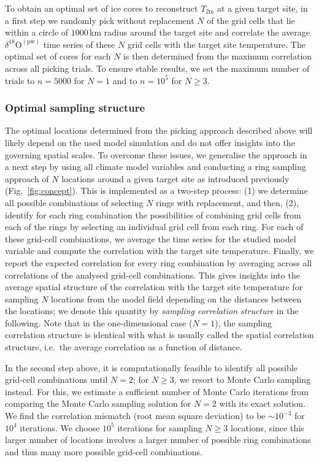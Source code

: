 \documentclass[cp, manuscript]{copernicus}
\begin{document}
To obtain an optimal set of ice cores to reconstruct $T_{2\mathrm{m}}$ at a
given target site, in a first step we randomly pick without replacement $N$ of
the grid cells that lie within a circle of $1000$\,km radius around the target
site and correlate the average $\delta^{18}\mathrm{O}^{\mathrm{(pw)}}$ time
series of these $N$ grid cells with the target site temperature. The optimal set
of cores for each $N$ is then determined from the maximum correlation across all
picking trials. To ensure stable results, we set the maximum number of trials to
$n=5000$ for $N=1$ and to $n=10^5$ for $N\geq3$.

\subsubsection{Optimal sampling structure}\label{methods:opt.sampling}

The optimal locations determined from the picking approach described above will
likely depend on the used model simulation and do not offer insights into the
governing spatial scales. To overcome these issues, we generalise the approach
in a next step by using all climate model variables and conducting a ring
sampling approach of $N$ locations around a given target site as introduced
previously (Fig.~\ref{fig:concept}). This is implemented as a two-step process:
(1) we determine all possible combinations of selecting $N$ rings with
replacement, and then, (2), identify for each ring combination the possibilities
of combining grid cells from each of the rings by selecting an individual grid
cell from each ring. For each of these grid-cell combinations, we average the
time series for the studied model variable and compute the correlation with the
target site temperature. Finally, we report the expected correlation for every
ring combination by averaging across all correlations of the analysed grid-cell
combinations. This gives insights into the average spatial structure of the
correlation with the target site temperature for sampling $N$ locations from the
model field depending on the distances between the locations; we denote this
quantity by \emph{sampling correlation structure} in the following. Note that in
the one-dimensional case ($N=1$), the sampling correlation structure is
identical with what is usually called the spatial correlation structure, i.e.\
the average correlation as a function of distance.

In the second step above, it is computationally feasible to identify all
possible grid-cell combinations until $N=2$; for $N\geq3$, we resort to Monte
Carlo sampling instead. For this, we estimate a sufficient number of Monte Carlo
iterations from comparing the Monte Carlo sampling solution for $N=2$ with its
exact solution. We find the correlation mismatch (root mean square deviation) to
be $\sim10^{-3}$ for $10^4$ iterations. We choose $10^5$ iterations for sampling
$N\geq3$ locations, since this larger number of locations involves a larger
number of possible ring combinations and thus many more possible grid-cell
combinations.
\end{document}
